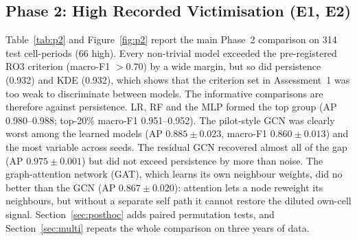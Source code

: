 \documentclass[11pt,a4paper]{report}
\begin{document}
\subsection{Phase 2: High Recorded Victimisation (E1, E2)}
\label{sec:p2res}
Table~\ref{tab:p2} and Figure~\ref{fig:p2} report the main Phase~2 comparison on 314 test cell-periods (66 high). Every non-trivial model exceeded the pre-registered RO3 criterion (macro-F1 $>0.70$) by a wide margin, but so did persistence (0.932) and KDE (0.932), which shows that the criterion set in Assessment~1 was too weak to discriminate between models. The informative comparisons are therefore against persistence. LR, RF and the MLP formed the top group (AP 0.980--0.988; top-20\% macro-F1 0.951--0.952). The pilot-style GCN was clearly worst among the learned models (AP $0.885\pm0.023$, macro-F1 $0.860\pm0.013$) and the most variable across seeds. The residual GCN recovered almost all of the gap (AP $0.975\pm0.001$) but did not exceed persistence by more than noise. The graph-attention network (GAT), which learns its own neighbour weights, did no better than the GCN (AP $0.867\pm0.020$): attention lets a node reweight its neighbours, but without a separate self path it cannot restore the diluted own-cell signal. Section~\ref{sec:posthoc} adds paired permutation tests, and Section~\ref{sec:multi} repeats the whole comparison on three years of data.
\end{document}
